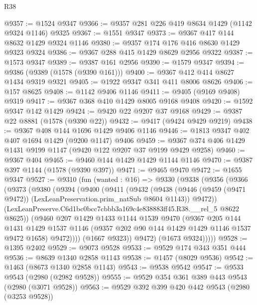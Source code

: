 \begin{lexlean}{R38}
\begin{coremodule}
@9357 := @1524 @9347
@9366 := @9357 @281 @226 @419 @8634 @1429 (@1142 @9324 @1146) @9325
@9367 := @1551 @9347
@9373 := @9367 @417 @144 @8632 @1429 @9324 @1146
@9380 := @9357 @174 @176 @416 @8630 @1429 @9323 @9324
@9386 := @9367 @288 @415 @1429 @8629 @2956 @9322
@9387 := @1573 @9347
@9389 := @9387 @161 @2956
@9390 := @1579 @9347
@9394 := @9386 (@9389 (@1578 (@9390 @161)))
@9400 := @9367 @412 @414 @8627 @1434 @9319 @9321
@9405 := @1922 @9347 @341 @411 @8006 @8626
@9406 := @157 @8625
@9408 := @1142 @9406 @1146
@9411 := @9405 (@9169 @9408) @9319
@9417 := @9367 @368 @410 @1429 @8005 @9168 @9408
@9420 := @1592 @9347 @142 @1429
@9424 := @9420 @22 @9207 @37 @9168
@9429 := @9387 @22 @8881 (@1578 (@9390 @22))
@9432 := @9417 (@9424 @9429 @9219)
@9438 := @9367 @408 @144 @1696 @1429 @9406 @1146
@9446 := @1813 @9347 @402 @407 @1694 @1429 (@9200 @1147) @9406
@9459 := @9367 @374 @406 @1429 @1431 @9199 @1147 (@9420 @122 @9207 @37 @9199 @9429 @9258)
@9460 := @9367 @404
@9465 := @9460 @144 @1429 @1429 @1144 @1146
@9470 := @9387 @397 @1144 (@1578 (@9390 @397))
@9471 := @9465 @9470
@9472 := @1655 @9347
@9527 := @9310
    (fun (wanted : @16) =>
    @9330
      (@9338
        (@9356
          (@9366
            (@9373
              (@9380
                (@9394
                  (@9400
                    (@9411
                      (@9432
                        (@9438
                          (@9446
                            (@9459 (@9471 @9472))
                            (LexLeanPreservation.prim_natSub @8604 @1143))
                          @9472))
                      (LexLeanPreserve.C6d1bc0bcc7cbbb3a169c4e838883ff45.R38.__rel_5 @8622 @8625))
                    (@9460
                      @207
                      @1429
                      @1433
                      @1144
                      @1539
                      @9470
                      (@9367
                        @205
                        @144
                        @1431
                        @1429
                        @1537
                        @1146
                        (@9357 @202 @90 @144 @1429 @1429 @1146 @1537 @9472 @1658)
                        @9472))))
                (@1667 @9323))
              @9472)
            (@1673 @9324)))))
@9528 := @1395 @2402
@9529 := @9073 @9528
@9533 := @9529 @174 @343 @351 @444
@9536 := @8639 @1340 @2858 @1143
@9538 := @1457 (@8029 @9536)
@9542 := @1463 (@8673 @1340 @2858 @1143)
@9543 := @9538 @9542
@9547 := @9533 @9543 (@2980 (@2982 @9528))
@9555 := @9529 @354 @361 @389 @443 @9543 (@2980 (@3071 @9528))
@9563 := @9529 @392 @399 @420 @442 @9543 (@2980 (@3253 @9528))

\end{coremodule}
\end{lexlean}
